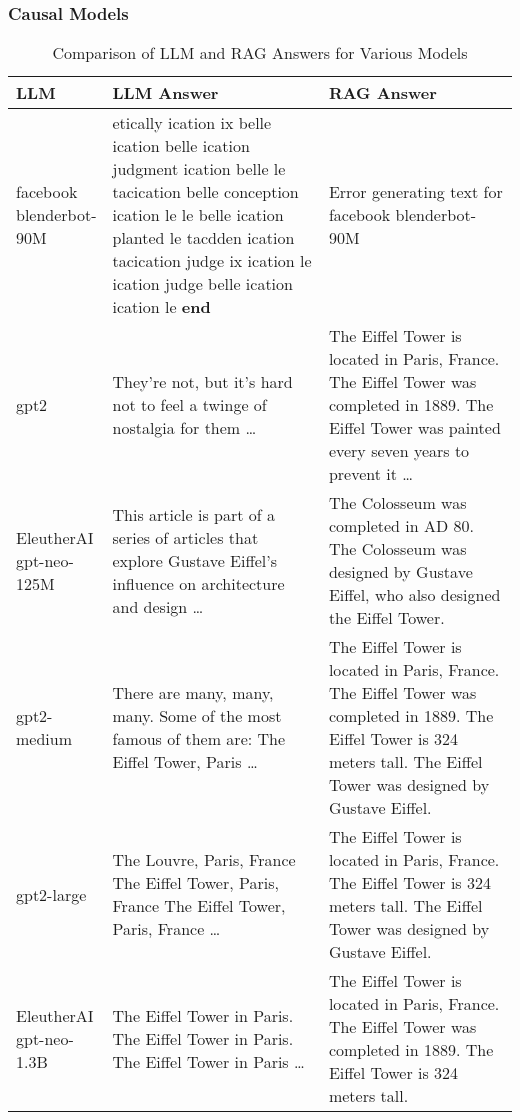 \documentclass{wseas}
\begin{document}
\subsubsection{Causal Models}


\begin{table*}[htbp]
\centering
\caption{Comparison of LLM and RAG Answers for Various Models} %
\begin{tabular}{|p{0.0977\linewidth}|p{0.4805\linewidth}|p{0.4219\linewidth}|}
\hline
\textbf{LLM} & \textbf{LLM Answer} & \textbf{RAG Answer} \\
\hline
facebook blenderbot-90M & etically ication ix belle ication belle ication judgment ication belle le tacication belle conception ication le le belle ication planted le tacdden ication tacication judge ix ication le ication judge belle ication ication le \textbf{end} & Error generating text for facebook blenderbot-90M \\
\hline
gpt2 & They're not, but it's hard not to feel a twinge of nostalgia for them \ldots{} & The Eiffel Tower is located in Paris, France. The Eiffel Tower was completed in 1889. The Eiffel Tower was painted every seven years to prevent it \ldots{} \\
\hline
EleutherAI gpt-neo-125M & This article is part of a series of articles that explore Gustave Eiffel's influence on architecture and design \ldots{} & The Colosseum was completed in AD 80. The Colosseum was designed by Gustave Eiffel, who also designed the Eiffel Tower. \\
\hline
gpt2-medium & There are many, many, many. Some of the most famous of them are: The Eiffel Tower, Paris \ldots{} & The Eiffel Tower is located in Paris, France. The Eiffel Tower was completed in 1889. The Eiffel Tower is 324 meters tall. The Eiffel Tower was designed by Gustave Eiffel. \\
\hline
gpt2-large & The Louvre, Paris, France The Eiffel Tower, Paris, France The Eiffel Tower, Paris, France \ldots{} & The Eiffel Tower is located in Paris, France. The Eiffel Tower is 324 meters tall. The Eiffel Tower was designed by Gustave Eiffel. \\
\hline
EleutherAI gpt-neo-1.3B & The Eiffel Tower in Paris. The Eiffel Tower in Paris. The Eiffel Tower in Paris \ldots{} & The Eiffel Tower is located in Paris, France. The Eiffel Tower was completed in 1889. The Eiffel Tower is 324 meters tall. \\
\hline
\end{tabular}
\end{table*}
\end{document}
